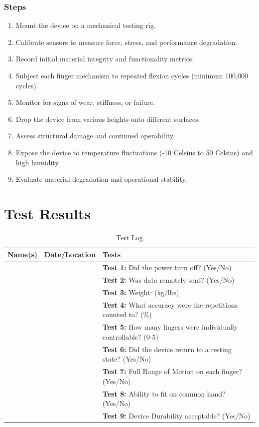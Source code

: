 \documentclass{article}
\begin{document}
\subsubsection{Steps}
\begin{enumerate}
    \item Mount the device on a mechanical testing rig.
    \item Calibrate sensors to measure force, stress, and performance degradation.
    \item Record initial material integrity and functionality metrics.
    \item Subject each finger mechanism to repeated flexion cycles (minimum 100,000 cycles).
    \item Monitor for signs of wear, stiffness, or failure.
    \item Drop the device from various heights onto different surfaces. 
    \item Assess structural damage and continued operability.
    \item Expose the device to temperature fluctuations (-10 Celsius to 50 Celsius) and high humidity.
    \item Evaluate material degradation and operational stability.
\end{enumerate}

\section{Test Results}

\begin{table}[H]
    \hspace*{-1 cm}
    \centering
    \begin{tabular}{|c|c|p{8cm}|}
        \hline
        \textbf{Name(s)} & \textbf{Date/Location} & \textbf{Tests} \\
        \hline
        & & \textbf{Test 1:} Did the power turn off? (Yes/No) \\
        \hline
        & & \textbf{Test 2:} Was data remotely sent? (Yes/No) \\
        \hline
        & & \textbf{Test 3:} Weight: (kg/lbs) \\ 
        \hline
        & & \textbf{Test 4:} What accuracy were the repetitions counted to? (\%) \\
        \hline
        & & \textbf{Test 5:} How many fingers were individually controllable? (0-5) \\
        \hline
        & & \textbf{Test 6:} Did the device return to a resting state? (Yes/No) \\
        \hline
        & & \textbf{Test 7:} Full Range of Motion on each finger? (Yes/No) \\
        \hline
        & & \textbf{Test 8:} Ability to fit on common hand? (Yes/No) \\
        \hline
        & & \textbf{Test 9:} Device Durability acceptable? (Yes/No) \\
        \hline
    \end{tabular}
    \caption{Test Log}
    \label{tab:test_log}
\end{table}
\end{document}
